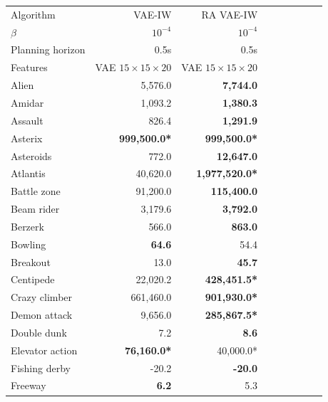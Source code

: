 \begin{table}[ht]
\begin{center}
\begin{small}
\begin{tabular}{lrrrrrrrl}
\toprule
Algorithm& VAE-IW & RA VAE-IW \\
$\beta$ & $10^{-4}$ & $10^{-4}$\\
Planning horizon& 0.5s & 0.5s  \\
Features & VAE $15 \times 15 \times 20$ & VAE $15 \times 15 \times 20$\\


\midrule

Alien           & 5,576.0              & \textbf{7,744.0}     \\
Amidar          & 1,093.2              & \textbf{1,380.3}     \\
Assault         & 826.4                & \textbf{1,291.9}     \\
Asterix         & \textbf{999,500.0*}   & \textbf{999,500.0*}   \\
Asteroids       & 772.0                & \textbf{12,647.0}    \\
Atlantis        & 40,620.0             & \textbf{1,977,520.0*} \\
Battle zone     & 91,200.0             & \textbf{115,400.0}   \\
Beam rider      & 3,179.6              & \textbf{3,792.0}     \\
Berzerk         & 566.0                & \textbf{863.0}       \\
Bowling         & \textbf{64.6}        & 54.4                 \\
Breakout        & 13.0                 & \textbf{45.7}        \\
Centipede       & 22,020.2             & \textbf{428,451.5*}   \\
Crazy climber   & 661,460.0            & \textbf{901,930.0*}   \\
Demon attack    & 9,656.0              & \textbf{285,867.5*}   \\
Double dunk     & 7.2                  & \textbf{8.6}         \\
Elevator action & \textbf{76,160.0*}    & 40,000.0*             \\
Fishing derby   & -20.2                & \textbf{-20.0}       \\
Freeway         & \textbf{6.2}         & 5.3                  \\

\end{tabular}
\end{small}
\end{center}
\end{table}
